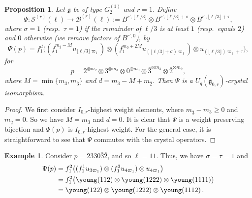 \documentclass[reqno]{amsart}
\newcommand{\g}{\mathfrak{g}}
\newcommand{\Sol}{\mathcal{S}} %
\newcommand{\btw}{\overline{2}}
\newcommand{\bth}{\overline{3}}
\theoremstyle{plain}
\newtheorem{prop}[thm]{Proposition}
\theoremstyle{definition}
\newtheorem{ex}[thm]{Example}
\numberwithin{equation}{section}
\begin{document}
\begin{prop}
\label{prop:soliton_crystal_bijection_G}
Let $\g$ be of type $G_2^{(1)}$ and $r = 1$.
Define
\[
\Psi \colon \Sol^{(r)}(\ell) \to \mathcal{B}^{(r)}(\ell) := B^{r', \lfloor \ell / 3 \rfloor} \otimes B^{r', \lfloor \ell / 3 \rfloor + \sigma} \otimes B^{r', \lfloor \ell / 3 \rfloor + \tau},
\]
where $\sigma = 1$ (resp.~$\tau = 1$) if the remainder of $\ell / 3$ is at least $1$ (resp.\ equals $2$) and $0$ otherwise (we remove factors of $B^{r',0}$), by
\[
\Psi(p) = f_1^d \bigl( (f_1^{m_{\bth}-M} u_{\lfloor \ell / 3 \rfloor \varpi_1}) \otimes (f_1^{m_0+2M} u_{(\lfloor \ell / 3 \rfloor + \sigma) \varpi_1}) \otimes u_{(\lfloor \ell / 3 \rfloor) \varpi_1 + \tau} \bigr),
\]
for
\[
p = 2^{\otimes m_2} \otimes 3^{\otimes m_3} \otimes 0^{\otimes m_0} \otimes \bth^{\otimes m_{\bth}} \otimes \btw^{\otimes m_{\btw}},
\]
where $M = \min\{m_3, m_{\bth}\}$ and $d = m_3 - M + m_{\btw}$.
Then $\Psi$ is a $U_q(\g_{0,r})$-crystal isomorphism.
\end{prop}

\begin{proof}
We first consider $I_{0,r}$-highest weight elements, where $m_{\bth} - m_3 \geq 0$ and $m_{\btw} = 0$.
So we have $M = m_3$ and $d = 0$.
It is clear that $\Psi$ is a weight preserving bijection and $\Psi(p)$ is $I_{0,r}$-highest weight.
For the general case, it is straightforward to see that $\Psi$ commutes with the crystal operators.
\end{proof}


\begin{ex}
Consider $p = 2330\bth\btw$, and so $\ell = 11$. Thus, we have $\sigma = \tau = 1$ and
\begin{align*}
\Psi(p) & = f_1^2\bigl( (f_1^1 u_{3\varpi_1}) \otimes (f_1^3 u_{4\varpi_1}) \otimes u_{4\varpi_1} \bigr)
\\ & = f_1^2 \bigl( \young(112) \otimes \young(1222) \otimes \young(1111) \bigr)
\\ & = \young(122) \otimes \young(1222) \otimes \young(1112)\,.
\end{align*}
\end{ex}
\end{document}

